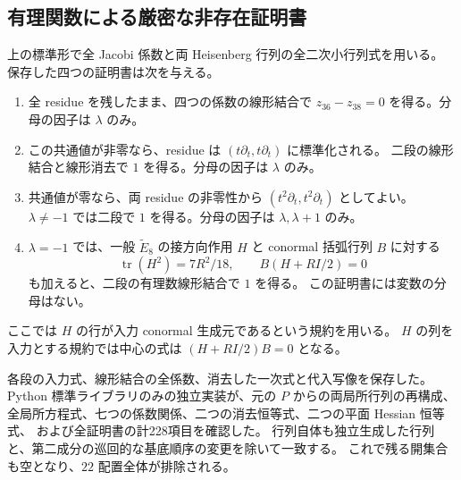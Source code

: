 \subsection{有理関数による厳密な非存在証明書}

上の標準形で全 Jacobi 係数と両 Heisenberg 行列の全二次小行列式を用いる。
保存した四つの証明書は次を与える。
\begin{enumerate}
\item 全 residue を残したまま、四つの係数の線形結合で
$z_{36}-z_{38}=0$ を得る。分母の因子は $\lambda$ のみ。
\item この共通値が非零なら、residue は $(t\partial_t,t\partial_t)$ に標準化される。
二段の線形結合と線形消去で $1$ を得る。分母の因子は $\lambda$ のみ。
\item 共通値が零なら、両 residue の非零性から
$(t^2\partial_t,t^2\partial_t)$ としてよい。
$\lambda\ne-1$ では二段で $1$ を得る。分母の因子は $\lambda,\lambda+1$ のみ。
\item $\lambda=-1$ では、一般 $\widetilde E_8$ の接方向作用 $H$ と
conormal 括弧行列 $B$ に対する
\[
\operatorname{tr}(H^2)=7R^2/18,\qquad B(H+R I/2)=0
\]
も加えると、二段の有理数線形結合で $1$ を得る。
この証明書には変数の分母はない。
\end{enumerate}
ここでは $H$ の行が入力 conormal 生成元であるという規約を用いる。
$H$ の列を入力とする規約では中心の式は $(H+RI/2)B=0$ となる。

各段の入力式、線形結合の全係数、消去した一次式と代入写像を保存した。
Python 標準ライブラリのみの独立実装が、元の $P$ からの両局所行列の再構成、
全局所方程式、七つの係数関係、二つの消去恒等式、二つの平面 Hessian 恒等式、
および全証明書の計228項目を確認した。
行列自体も独立生成した行列と、第二成分の巡回的な基底順序の変更を除いて一致する。
これで残る開集合も空となり、$22$ 配置全体が排除される。
